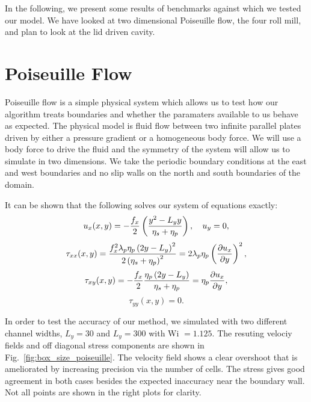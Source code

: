 In the following, we present some results of benchmarks against which we tested our model. We have looked at two dimensional Poiseuille flow, the four roll mill, and plan to look at the lid driven cavity.

\section{Poiseuille Flow}
Poiseuille flow is a simple physical system which allows us to test how our algorithm treats boundaries and whether the paramaters available to us behave as expected. The physical model is fluid flow between two infinite parallel plates driven by either a pressure gradient or a homogeneous body force. We will use a body force to drive the fluid and the symmetry of the system will allow us to simulate in two dimensions. We take the periodic boundary conditions at the east and west boundaries and no slip walls on the north and south boundaries of the domain.

It can be shown that the following solves our system of equations exactly:
\begin{equation}
u_x(x,y) = -\frac{f_x}{2}\left( \frac{y^2 - L_y y}{\eta_s +\eta_p}\right), \quad u_y = 0,
\end{equation}
\begin{equation}
\tau_{xx}(x,y) = \frac{f^2_x \lambda_p \eta_p \left( 2y - L_y\right)^2}{2\left( \eta_s + \eta_p\right)^2} = 2\lambda_p\eta_p\left(\frac{\partial u_x}{\partial y}\right)^2,
\end{equation}
\begin{equation}
\tau_{xy}(x,y) = -\frac{f_x}{2} \frac{\eta_p\left( 2y-L_y\right)}{\eta_s+\eta_p} = \eta_p\frac{\partial u_x}{\partial y},
\end{equation}
\begin{equation}
\tau_{yy}(x,y) = 0.
\end{equation}

In order to test the accuracy of our method, we simulated with two different channel widths, $L_y = 30$ and $L_y = 300$ with Wi $= 1.125$. The resuting velociy fields and off diagonal stress components are shown in Fig.~\ref{fig:box_size_poiseuille}. The velocity field shows a clear overshoot that is ameliorated by increasing precision via the number of cells. The stress gives good agreement in both cases besides the expected inaccuracy near the boundary wall. Not all points are shown in the right plots for clarity.

